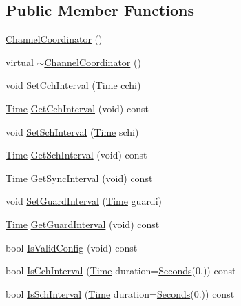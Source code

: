 \subsection*{Public Member Functions}
\begin{DoxyCompactItemize}
\item 
\hyperlink{classns3_1_1ChannelCoordinator_a4095d7dc0d416489b2b7e897f15c5d08}{Channel\+Coordinator} ()
\item 
virtual \hyperlink{classns3_1_1ChannelCoordinator_a9902bc6c2115857af7d00b80d419f024}{$\sim$\+Channel\+Coordinator} ()
\item 
void \hyperlink{classns3_1_1ChannelCoordinator_ad3495b40f43074a164ed3e9dfa48376b}{Set\+Cch\+Interval} (\hyperlink{classns3_1_1Time}{Time} cchi)
\item 
\hyperlink{classns3_1_1Time}{Time} \hyperlink{classns3_1_1ChannelCoordinator_a9716fda402d8768bf5488e7471c41eff}{Get\+Cch\+Interval} (void) const 
\item 
void \hyperlink{classns3_1_1ChannelCoordinator_a52f664e25f128265ec6ce8ec353f94f6}{Set\+Sch\+Interval} (\hyperlink{classns3_1_1Time}{Time} schi)
\item 
\hyperlink{classns3_1_1Time}{Time} \hyperlink{classns3_1_1ChannelCoordinator_ac746b747df6aa82985ce5a7ac5ef77aa}{Get\+Sch\+Interval} (void) const 
\item 
\hyperlink{classns3_1_1Time}{Time} \hyperlink{classns3_1_1ChannelCoordinator_a1e92e2033eb6f01d792dbb06808bff81}{Get\+Sync\+Interval} (void) const 
\item 
void \hyperlink{classns3_1_1ChannelCoordinator_a86f6922da50c443d0114a1bd212153ae}{Set\+Guard\+Interval} (\hyperlink{classns3_1_1Time}{Time} guardi)
\item 
\hyperlink{classns3_1_1Time}{Time} \hyperlink{classns3_1_1ChannelCoordinator_a818fcbf14bd42870849b245540acacdb}{Get\+Guard\+Interval} (void) const 
\item 
bool \hyperlink{classns3_1_1ChannelCoordinator_a095c5690097ab3b081b53e026bacffdd}{Is\+Valid\+Config} (void) const 
\item 
bool \hyperlink{classns3_1_1ChannelCoordinator_a8a7e45692213154adb0341ab6de183e4}{Is\+Cch\+Interval} (\hyperlink{classns3_1_1Time}{Time} duration=\hyperlink{group__timecivil_ga33c34b816f8ff6628e33d5c8e9713b9e}{Seconds}(0.)) const 
\item 
bool \hyperlink{classns3_1_1ChannelCoordinator_a347bdf5153926f4ee16fb7b202db3121}{Is\+Sch\+Interval} (\hyperlink{classns3_1_1Time}{Time} duration=\hyperlink{group__timecivil_ga33c34b816f8ff6628e33d5c8e9713b9e}{Seconds}(0.)) const 

\end{DoxyCompactItemize}
